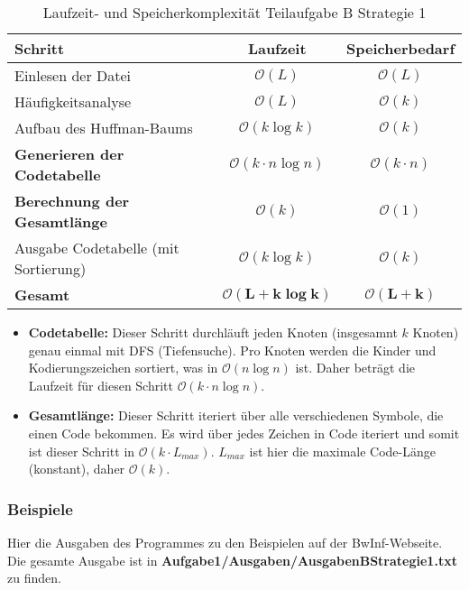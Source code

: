 \documentclass[a4paper,10pt,ngerman]{scrartcl}
\begin{document}
\begin{table}[H]
\centering
\begin{tabular}{|l|c|c|}
\hline
\textbf{Schritt} & \textbf{Laufzeit} & \textbf{Speicherbedarf} \\
\hline
Einlesen der Datei & $\mathcal{O}(L)$ & $\mathcal{O}(L)$ \\
Häufigkeitsanalyse & $\mathcal{O}(L)$ & $\mathcal{O}(k)$ \\
Aufbau des Huffman-Baums & $\mathcal{O}(k \log k)$ & $\mathcal{O}(k)$ \\
\textbf{Generieren der Codetabelle} & $\mathcal{O}(k \cdot n \log n)$ & $\mathcal{O}(k \cdot n)$ \\
\textbf{Berechnung der Gesamtlänge} & $\mathcal{O}(k)$ & $\mathcal{O}(1)$ \\
Ausgabe Codetabelle (mit Sortierung) & $\mathcal{O}(k \log k)$ & $\mathcal{O}(k)$ \\
\hline
\textbf{Gesamt} & $\boldsymbol{\mathcal{O}(L + k \log k)}$ & $\boldsymbol{\mathcal{O}(L + k)}$ \\
\hline
\end{tabular}
\caption{Laufzeit- und Speicherkomplexität Teilaufgabe B Strategie 1}
\end{table}

\vspace{1em}

\begin{itemize}
  \item \textbf{Codetabelle:} Dieser Schritt durchläuft jeden Knoten (insgesamnt $k$ Knoten) genau einmal mit DFS (Tiefensuche). Pro Knoten werden die Kinder und Kodierungszeichen sortiert, was in $\mathcal{O}(n \log n)$ ist. Daher beträgt die Laufzeit für diesen Schritt $\mathcal{O}(k \cdot n \log n)$.

  \item \textbf{Gesamtlänge:} Dieser Schritt iteriert über alle verschiedenen Symbole, die einen Code bekommen. Es wird über jedes Zeichen in Code iteriert und somit ist dieser Schritt in $\mathcal{O}(k \cdot L_{max})$. $L_{max}$ ist hier die maximale Code-Länge (konstant), daher $\mathcal{O}(k)$.
\end{itemize}
\subsubsection{Beispiele}
Hier die Ausgaben des Programmes zu den Beispielen auf der BwInf-Webseite. \\Die gesamte Ausgabe ist in \textbf{Aufgabe1/Ausgaben/AusgabenBStrategie1.txt} zu finden. 
\end{document}
